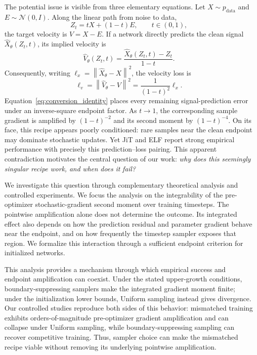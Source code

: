 \documentclass{article}
\theoremstyle{plain}
\theoremstyle{definition}
\theoremstyle{remark}
\newcommand{\norm}[1]{\left\lVert #1\right\rVert}
\begin{document}
The potential issue is visible from three elementary equations. Let $X\sim p_{\mathrm{data}}$ and $E\sim\mathcal N(0,I)$. Along the linear path from noise to data,
\begin{equation}
Z_t=tX+(1-t)E,\qquad t\in(0,1),
\label{eq:path}
\end{equation}
the target velocity is $V=X-E$. If a network directly predicts the clean signal $\hat X_\theta(Z_t,t)$, its implied velocity is
\begin{equation}
\hat V_\theta(Z_t,t)=\frac{\hat X_\theta(Z_t,t)-Z_t}{1-t}.
\label{eq:implied_velocity}
\end{equation}
Consequently, writing $\ell_x=\norm{\hat X_\theta-X}^2$, the velocity loss is
\begin{equation}
\ell_v=\norm{\hat V_\theta-V}^2
=\frac{1}{(1-t)^2}\ell_x.
\label{eq:conversion_identity}
\end{equation}
Equation~\eqref{eq:conversion_identity} places every remaining signal-prediction error under an inverse-square endpoint factor. As $t\to1$, the corresponding sample gradient is amplified by $(1-t)^{-2}$ and its second moment by $(1-t)^{-4}$. On its face, this recipe appears poorly conditioned: rare samples near the clean endpoint may dominate stochastic updates. Yet JiT and ELF report strong empirical performance with precisely this prediction--loss pairing. This apparent contradiction motivates the central question of our work: \emph{why does this seemingly singular recipe work, and when does it fail?}

We investigate this question through complementary theoretical analysis and controlled experiments. We focus the analysis on the integrability of the pre-optimizer stochastic-gradient second moment over training timesteps. The pointwise amplification alone does not determine the outcome. Its integrated effect also depends on how the prediction residual and parameter gradient behave near the endpoint, and on how frequently the timestep sampler exposes that region. We formalize this interaction through a sufficient endpoint criterion for initialized networks.

This analysis provides a mechanism through which empirical success and endpoint amplification can coexist. Under the stated upper-growth conditions, boundary-suppressing samplers make the integrated gradient moment finite; under the initialization lower bounds, Uniform sampling instead gives divergence. Our controlled studies reproduce both sides of this behavior: mismatched training exhibits orders-of-magnitude pre-optimizer gradient amplification and can collapse under Uniform sampling, while boundary-suppressing sampling can recover competitive training. Thus, sampler choice can make the mismatched recipe viable without removing its underlying pointwise amplification.
\end{document}
